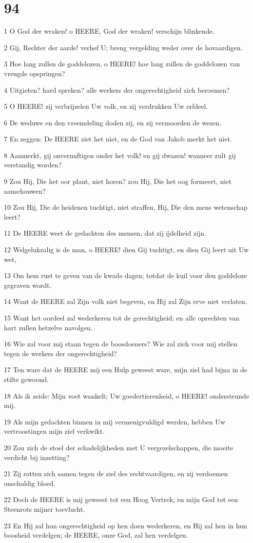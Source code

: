 \chapter{94}

\par 1 O God der wraken! o HEERE, God der wraken! verschijn blinkende.
\par 2 Gij, Rechter der aarde! verhef U; breng vergelding weder over de hovaardigen.
\par 3 Hoe lang zullen de goddelozen, o HEERE! hoe lang zullen de goddelozen van vreugde opspringen?
\par 4 Uitgieten? hard spreken? alle werkers der ongerechtigheid zich beroemen?
\par 5 O HEERE! zij verbrijzelen Uw volk, en zij verdrukken Uw erfdeel.
\par 6 De weduwe en den vreemdeling doden zij, en zij vermoorden de wezen.
\par 7 En zeggen: De HEERE ziet het niet, en de God van Jakob merkt het niet.
\par 8 Aanmerkt, gij onvernuftigen onder het volk! en gij dwazen! wanneer zult gij verstandig worden?
\par 9 Zou Hij, Die het oor plant, niet horen? zou Hij, Die het oog formeert, niet aanschouwen?
\par 10 Zou Hij, Die de heidenen tuchtigt, niet straffen, Hij, Die den mens wetenschap leert?
\par 11 De HEERE weet de gedachten des mensen, dat zij ijdelheid zijn.
\par 12 Welgelukzalig is de man, o HEERE! dien Gij tuchtigt, en dien Gij leert uit Uw wet,
\par 13 Om hem rust te geven van de kwade dagen; totdat de kuil voor den goddeloze gegraven wordt.
\par 14 Want de HEERE zal Zijn volk niet begeven, en Hij zal Zijn erve niet verlaten.
\par 15 Want het oordeel zal wederkeren tot de gerechtigheid; en alle oprechten van hart zullen hetzelve navolgen.
\par 16 Wie zal voor mij staan tegen de boosdoeners? Wie zal zich voor mij stellen tegen de werkers der ongerechtigheid?
\par 17 Ten ware dat de HEERE mij een Hulp geweest ware, mijn ziel had bijna in de stilte gewoond.
\par 18 Als ik zeide: Mijn voet wankelt; Uw goedertierenheid, o HEERE! ondersteunde mij.
\par 19 Als mijn gedachten binnen in mij vermenigvuldigd werden, hebben Uw vertroostingen mijn ziel verkwikt.
\par 20 Zou zich de stoel der schadelijkheden met U vergezelschappen, die moeite verdicht bij inzetting?
\par 21 Zij rotten zich samen tegen de ziel des rechtvaardigen, en zij verdoemen onschuldig bloed.
\par 22 Doch de HEERE is mij geweest tot een Hoog Vertrek, en mijn God tot een Steenrots mijner toevlucht.
\par 23 En Hij zal hun ongerechtigheid op hen doen wederkeren, en Hij zal hen in hun boosheid verdelgen; de HEERE, onze God, zal hen verdelgen.

